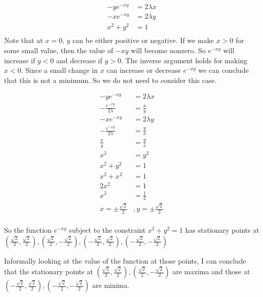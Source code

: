 \documentclass[10pt,\jkfside,a4paper]{article}
\begin{document}
\begin{enumerate}
\begin{enumerate}
\begin{equation}
\begin{split}
-ye^{-xy} &= 2\lambda x \\
-xe^{-xy} &= 2\lambda y \\
x^{2} + y^{2} &= 1 \\
\end{split}
\end{equation}
Note that at $x = 0$, $y$ can be either positive or negative. If we make $x > 0$ for some 
small value, then the value of $-xy$ will become nonzero. So $e^{-xy}$ will increase if $y < 0$ 
and decrease if $y > 0$. The inverse argument holds for making $x < 0$. Since a small change 
in $x$ can increase or decrease $e^{-xy}$ we can conclude that this is not a minimum. So we do 
not need to consider this case.

\begin{equation}
\begin{split}
-ye^{-xy} &= 2\lambda x \\
-\frac{e^{-xy}}{2\lambda} &= \frac{x}{y} \\
-xe^{-xy} &= 2\lambda y \\
-\frac{e^{-xy}}{2\lambda} &= \frac{y}{x} \\
\frac{x}{y} &= \frac{y}{x} \\
x^{2} &= y^{2} \\
x^{2} + y^{2} &= 1 \\ 
x^{2} + x^{2} &= 1 \\
2x^{2} &= 1 \\
x^{2} &= \frac{1}{2} \\
x = \pm\frac{\sqrt{2}}{2}&, y = \pm\frac{\sqrt{2}}{2} \\
\end{split}
\end{equation}

So the function $e^{-xy}$ subject to the constraint $x^{2} + y^{2} = 1$ has stationary points at 
$\left(\frac{\sqrt{2}}{2}, \frac{\sqrt{2}}{2}\right), \left(\frac{\sqrt{2}}{2}, -\frac{\sqrt{2}}{2}\right), \left(-\frac{\sqrt{2}}{2}, \frac{\sqrt{2}}{2}\right), \left(-\frac{\sqrt{2}}{2}, -\frac{\sqrt{2}}{2}\right)$

Informally looking at the value of the function at those points, I can conclude that the 
stationary points at $\left(\frac{\sqrt{2}}{2}, \frac{\sqrt{2}}{2}\right), \left(\frac{\sqrt{2}}{2}, -\frac{\sqrt{2}}{2}\right)$ are maxima 
and those at \\ $\left(-\frac{\sqrt{2}}{2}, \frac{\sqrt{2}}{2}\right), \left(-\frac{\sqrt{2}}{2}, -\frac{\sqrt{2}}{2}\right)$ 
are minima.


\end{enumerate}
\end{enumerate}
\end{document}
